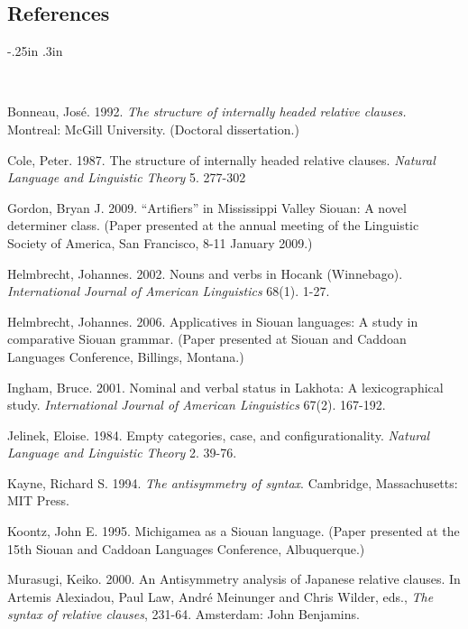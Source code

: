 \begin{refsection}
\section*{References}

\newenvironment{reflist} {\begin{list} {} {\listparindent -.25in
\leftmargin .3in} \item \ \vspace{-.3in} } {\end{list} }

\begin{reflist}

Bonneau, Jos\'e. 1992. \textit{The structure of internally headed relative clauses.} Montreal: McGill University. (Doctoral dissertation.) 

Cole, Peter. 1987. The structure of internally headed relative clauses. \textit{Natural Language and Linguistic Theory} 5. 277-302

Gordon, Bryan J. 2009. ``Artifiers'' in Mississippi Valley Siouan: A novel determiner class. (Paper presented at the annual meeting of the Linguistic Society of America, San Francisco, 8-11 January 2009.)

Helmbrecht, Johannes. 2002. Nouns and verbs in Hocank (Winnebago). \textit{International Journal of American Linguistics} 68(1). 1-27.

Helmbrecht, Johannes. 2006. Applicatives in Siouan languages: A study in comparative Siouan grammar. (Paper presented at Siouan and Caddoan Languages Conference, Billings, Montana.)

Ingham, Bruce. 2001. Nominal and verbal status in Lakhota: A lexicographical study. \textit{International Journal of American Linguistics} 67(2). 167-192.

Jelinek, Eloise. 1984. Empty categories, case, and configurationality. \textit{Natural Language and Linguistic Theory} 2. 39-76.

Kayne, Richard S. 1994. \textit{The antisymmetry of syntax}. Cambridge, Massachusetts: MIT Press.
                 
Koontz, John E. 1995. Michigamea as a Siouan language. (Paper presented at the 15th Siouan and Caddoan Languages Conference, Albuquerque.)

Murasugi, Keiko. 2000. An Antisymmetry analysis of Japanese relative clauses. In Artemis Alexiadou, Paul Law, Andr\'e Meinunger and Chris Wilder, eds., \textit{The syntax of relative clauses}, 231-64. Amsterdam: John Benjamins. 


\end{reflist}
\end{refsection}
